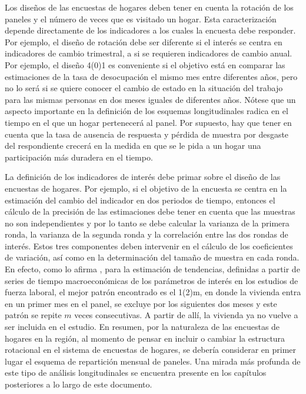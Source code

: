 \documentclass[
  12pt,
  spanish,
]{book}
\begin{document}
Los diseños de las encuestas de hogares deben tener en cuenta la rotación de los paneles y el número de veces que es visitado un hogar. Esta caracterización depende directamente de los indicadores a los cuales la encuesta debe responder. Por ejemplo, el diseño de rotación debe ser diferente si el interés se centra en indicadores de cambio trimestral, a si se requieren indicadores de cambio anual. Por ejemplo, el diseño 4(0)1 es conveniente si el objetivo está en comparar las estimaciones de la tasa de desocupación el mismo mes entre diferentes años, pero no lo será si se quiere conocer el cambio de estado en la situación del trabajo para las mismas personas en dos meses iguales de diferentes años. Nótese que un aspecto importante en la definición de los esquemas longitudinales radica en el tiempo en el que un hogar pertenecerá al panel. Por supuesto, hay que tener en cuenta que la tasa de ausencia de respuesta y pérdida de muestra por desgaste del respondiente crecerá en la medida en que se le pida a un hogar una participación más duradera en el tiempo.

La definición de los indicadores de interés debe primar sobre el diseño de las encuestas de hogares. Por ejemplo, si el objetivo de la encuesta se centra en la estimación del cambio del indicador en dos periodos de tiempo, entonces el cálculo de la precisión de las estimaciones debe tener en cuenta que las muestras no son independientes y por lo tanto se debe calcular la varianza de la primera ronda, la varianza de la segunda ronda y la correlación entre las dos rondas de interés. Estos tres componentes deben intervenir en el cálculo de los coeficientes de variación, así como en la determinación del tamaño de muestra en cada ronda. En efecto, como lo afirma \citet[pág. 236]{McLaren_Steel_2001}, para la estimación de tendencias, definidas a partir de series de tiempo macroeconómicas de los parámetros de interés en los estudios de fuerza laboral, el mejor patrón encontrado es el 1(2)m, en donde la vivienda entra en un primer mes en el panel, se excluye por los siguientes dos meses y este patrón se repite \(m\) veces consecutivas. A partir de allí, la vivienda ya no vuelve a ser incluida en el estudio. En resumen, por la naturaleza de las encuestas de hogares en la región, al momento de pensar en incluir o cambiar la estructura rotacional en el sistema de encuestas de hogares, se debería considerar en primer lugar el esquema de repartición mensual de paneles. Una mirada más profunda de este tipo de análisis longitudinales se encuentra presente en los capítulos posteriores a lo largo de este documento.
\end{document}

